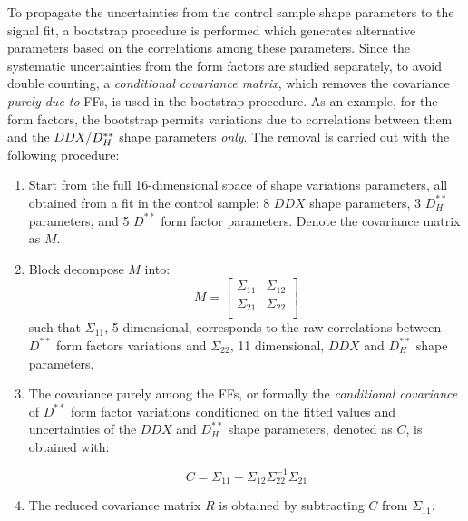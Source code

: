 To propagate the uncertainties from the control sample shape parameters to
the signal fit,
a bootstrap procedure is performed which generates alternative parameters based
on the correlations among these parameters.
Since the systematic uncertainties from the \Dstst form factors are
studied separately,
to avoid double counting,
a \emph{conditional covariance matrix},
which removes the covariance \emph{purely due to} \Dstst FFs,
is used in the bootstrap procedure.
As an example,
for the \Dstst form factors,
the bootstrap permits variations due to
correlations between them and the $DDX$/$D^{**}_H$ shape parameters \emph{only}.
The removal is carried out with the following procedure:

\begin{enumerate}
    \item Start from the full 16-dimensional space of shape variations
        parameters, all obtained from a fit in the control sample:
        8 $DDX$ shape parameters,
        3 $D^{**}_H$ parameters,
        and 5 $D^{**}$ form factor parameters.
        Denote the covariance matrix as $M$.

    \item Block decompose $M$ into:
        \begin{equation}
            M =
            \begin{bmatrix}
                \Sigma_{11} &  \Sigma_{12} \\
                \Sigma_{21} &  \Sigma_{22} \\
            \end{bmatrix}
        \end{equation}
        such that $\Sigma_{11}$,
        5 dimensional,
        corresponds to the raw correlations between
        $D^{**}$ form factors variations and
        $\Sigma_{22}$, 11 dimensional,
        $DDX$ and $D^{**}_H$ shape parameters.

    \item The covariance purely among the \Dstst FFs,
        or formally the \emph{conditional covariance} of $D^{**}$ form factor
        variations conditioned on the fitted values and uncertainties of
        the $DDX$ and $D^{**}_H$ shape parameters,
        denoted as $C$, is obtained with:

        \begin{equation}
            C = \Sigma_{11} - \Sigma_{12} \Sigma^{-1}_{22} \Sigma_{21}
        \end{equation}

    \item The reduced covariance matrix $R$ is obtained by subtracting $C$ from
        $\Sigma_{11}$.
\end{enumerate}

